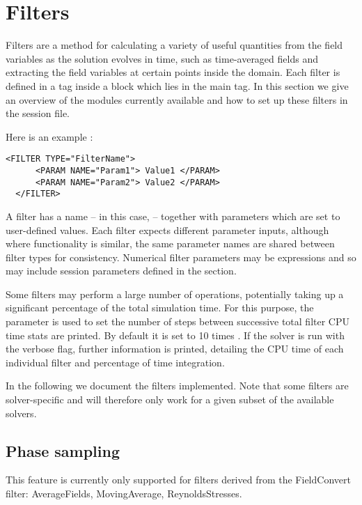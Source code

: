 \section{Filters}

Filters are a method for calculating a variety of useful quantities from the
field variables as the solution evolves in time, such as time-averaged fields
and extracting the field variables at certain points inside the domain. Each
filter is defined in a  tag inside a  block which
lies in the main  tag. In this section we give an overview of the
modules currently available and how to set up these filters in the session file.

Here is an example :

\begin{lstlisting}[style=XMLStyle,gobble=2]
  <FILTER TYPE="FilterName">
      <PARAM NAME="Param1"> Value1 </PARAM>
      <PARAM NAME="Param2"> Value2 </PARAM>
  </FILTER>
\end{lstlisting}

A filter has a name -- in this case,  -- together with
parameters which are set to user-defined values. Each filter expects different
parameter inputs, although where functionality is similar, the same parameter
names are shared between filter types for consistency. Numerical filter
parameters may be expressions and so may include session parameters defined in
the  section.

Some filters may perform a large number of operations, potentially taking up
a significant percentage of the total simulation time. For this purpose, the parameter
 is used to set the number of steps between successive total
filter CPU time stats are printed. By default it is set to 10 times . If the
solver is run with the verbose  flag, further information is printed, detailing the
CPU time of each individual filter and percentage of time integration.

In the following we document the filters implemented. Note that some filters are
solver-specific and will therefore only work for a given subset of the available
solvers.

\subsection{Phase sampling}
\begin{notebox}
  This feature is currently only supported for filters derived from the
  FieldConvert filter: AverageFields, MovingAverage, ReynoldsStresses.
\end{notebox}

